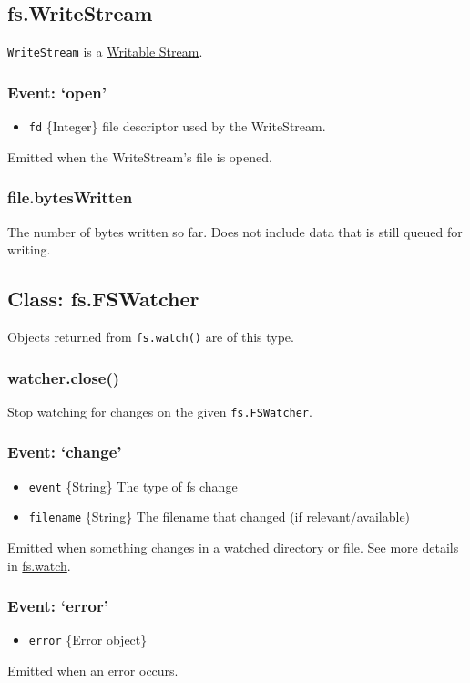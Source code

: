 \subsection{fs.WriteStream}

\texttt{WriteStream} is a
\href{stream.html\#stream\_writable\_stream}{Writable Stream}.

\subsubsection{Event: `open'}

\begin{itemize}
\item
  \texttt{fd} \{Integer\} file descriptor used by the WriteStream.
\end{itemize}

Emitted when the WriteStream's file is opened.

\subsubsection{file.bytesWritten}

The number of bytes written so far. Does not include data that is still
queued for writing.

\subsection{Class: fs.FSWatcher}

Objects returned from \texttt{fs.watch()} are of this type.

\subsubsection{watcher.close()}

Stop watching for changes on the given \texttt{fs.FSWatcher}.

\subsubsection{Event: `change'}

\begin{itemize}
\item
  \texttt{event} \{String\} The type of fs change
\item
  \texttt{filename} \{String\} The filename that changed (if
  relevant/available)
\end{itemize}

Emitted when something changes in a watched directory or file. See more
details in
\hyperref[fs_fs_watch_filename_options_listener]{fs.watch}.

\subsubsection{Event: `error'}

\begin{itemize}
\item
  \texttt{error} \{Error object\}
\end{itemize}

Emitted when an error occurs.
